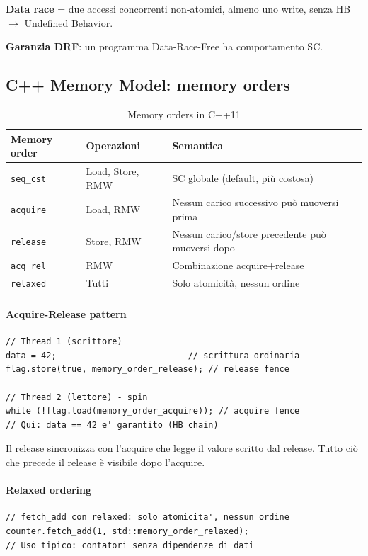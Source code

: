 \documentclass[11pt,a4paper]{article}
\theoremstyle{remark}
\begin{document}
\textbf{Data race} = due accessi concorrenti non-atomici, almeno uno write, senza HB $\to$ Undefined Behavior.

\textbf{Garanzia DRF}: un programma Data-Race-Free ha comportamento SC.

\subsection{C++ Memory Model: memory orders}

\begin{table}[H]
\centering
\begin{tabular}{lll}
\toprule
Memory order & Operazioni & Semantica \\
\midrule
\texttt{seq\_cst} & Load, Store, RMW & SC globale (default, più costosa) \\
\texttt{acquire} & Load, RMW & Nessun carico successivo può muoversi prima \\
\texttt{release} & Store, RMW & Nessun carico/store precedente può muoversi dopo \\
\texttt{acq\_rel} & RMW & Combinazione acquire+release \\
\texttt{relaxed} & Tutti & Solo atomicità, nessun ordine \\
\bottomrule
\end{tabular}
\caption{Memory orders in C++11}
\end{table}

\paragraph{Acquire-Release pattern}

\begin{lstlisting}
// Thread 1 (scrittore)
data = 42;                          // scrittura ordinaria
flag.store(true, memory_order_release); // release fence

// Thread 2 (lettore) - spin
while (!flag.load(memory_order_acquire)); // acquire fence
// Qui: data == 42 e' garantito (HB chain)
\end{lstlisting}

Il release sincronizza con l'acquire che legge il valore scritto dal release. Tutto ciò che precede il release è visibile dopo l'acquire.

\paragraph{Relaxed ordering}
\begin{lstlisting}
// fetch_add con relaxed: solo atomicita', nessun ordine
counter.fetch_add(1, std::memory_order_relaxed);
// Uso tipico: contatori senza dipendenze di dati
\end{lstlisting}
\end{document}
